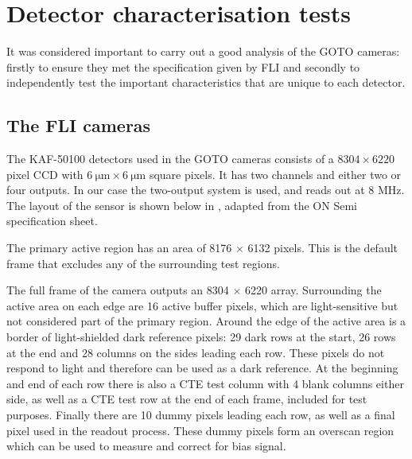 \section{Detector characterisation tests}
\label{sec:detectors}
\begin{colsection}


\begin{colsection}

It was considered important to carry out a good analysis of the GOTO cameras: firstly to ensure they met the specification given by FLI and secondly to independently test the important characteristics that are unique to each detector.

\end{colsection}

\newpage
\subsection{The FLI cameras}
\label{sec:FLI}
\begin{colsection}

The KAF-50100 detectors used in the GOTO cameras consists of a $8304 \times 6220$ pixel CCD with $\SI{6}{\micro\metre} \times \SI{6}{\micro\metre}$ square pixels. It has two channels and either two or four outputs. In our case the two-output system is used, and reads out at 8 MHz. The layout of the sensor is shown below in , adapted from the ON Semi specification sheet.

The primary active region has an area of 8176 $\times$ 6132 pixels. This is the default frame that excludes any of the surrounding test regions.

The full frame of the camera outputs an 8304 $\times$ 6220 array. Surrounding the active area on each edge are 16 active buffer pixels, which are light-sensitive but not considered part of the primary region. Around the edge of the active area is a border of light-shielded dark reference pixels: 29 dark rows at the start, 26 rows at the end and 28 columns on the sides leading each row. These pixels do not respond to light and therefore can be used as a dark reference. At the beginning and end of each row there is also a CTE test column with 4 blank columns either side, as well as a CTE test row at the end of each frame, included for test purposes. Finally there are 10 dummy pixels leading each row, as well as a final pixel used in the readout process. These dummy pixels form an overscan region which can be used to measure and correct for bias signal.


\end{colsection}
\end{colsection}

